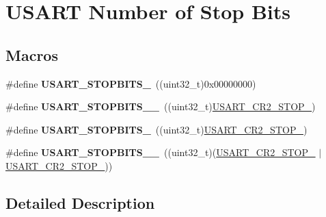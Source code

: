\hypertarget{group___u_s_a_r_t___stop___bits}{}\section{U\+S\+A\+RT Number of Stop Bits}
\label{group___u_s_a_r_t___stop___bits}
\subsection*{Macros}
\begin{DoxyCompactItemize}
\item 
\#define {\bfseries U\+S\+A\+R\+T\+\_\+\+S\+T\+O\+P\+B\+I\+T\+S\+\_}~((uint32\+\_\+t)0x00000000)\hypertarget{group___u_s_a_r_t___stop___bits_ga82aae3118e9cd59bb270c028e21c23b4}{}\label{group___u_s_a_r_t___stop___bits_ga82aae3118e9cd59bb270c028e21c23b4}

\item 
\#define {\bfseries U\+S\+A\+R\+T\+\_\+\+S\+T\+O\+P\+B\+I\+T\+S\+\_\+\_}~((uint32\+\_\+t)\hyperlink{group___peripheral___registers___bits___definition_gaee6ee01c6e5325b378b2209ef20d0a61}{U\+S\+A\+R\+T\+\_\+\+C\+R2\+\_\+\+S\+T\+O\+P\+\_})\hypertarget{group___u_s_a_r_t___stop___bits_gaa6e5782774150ff935df3fc06d9ec0c4}{}\label{group___u_s_a_r_t___stop___bits_gaa6e5782774150ff935df3fc06d9ec0c4}

\item 
\#define {\bfseries U\+S\+A\+R\+T\+\_\+\+S\+T\+O\+P\+B\+I\+T\+S\+\_}~((uint32\+\_\+t)\hyperlink{group___peripheral___registers___bits___definition_ga2b24d14f0e5d1c76c878b08aad44d02b}{U\+S\+A\+R\+T\+\_\+\+C\+R2\+\_\+\+S\+T\+O\+P\+\_})\hypertarget{group___u_s_a_r_t___stop___bits_gaf8d022e62f55ceb7b5e03eea336b5c45}{}\label{group___u_s_a_r_t___stop___bits_gaf8d022e62f55ceb7b5e03eea336b5c45}

\item 
\#define {\bfseries U\+S\+A\+R\+T\+\_\+\+S\+T\+O\+P\+B\+I\+T\+S\+\_\+\_}~((uint32\+\_\+t)(\hyperlink{group___peripheral___registers___bits___definition_gaee6ee01c6e5325b378b2209ef20d0a61}{U\+S\+A\+R\+T\+\_\+\+C\+R2\+\_\+\+S\+T\+O\+P\+\_} $\vert$ \hyperlink{group___peripheral___registers___bits___definition_ga2b24d14f0e5d1c76c878b08aad44d02b}{U\+S\+A\+R\+T\+\_\+\+C\+R2\+\_\+\+S\+T\+O\+P\+\_}))\hypertarget{group___u_s_a_r_t___stop___bits_ga5b799017a5d9ab7de71a49c625f87532}{}\label{group___u_s_a_r_t___stop___bits_ga5b799017a5d9ab7de71a49c625f87532}

\end{DoxyCompactItemize}


\subsection{Detailed Description}
